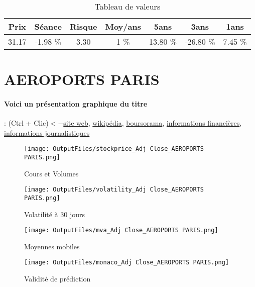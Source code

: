 \documentclass[11pt,a4paper]{report}%
\begin{document}
\begin{table}[H]
  \centering
    \begin{tabular}{|c|c|c|c|c|c|c|}
    \hline
    Prix & Séance & Risque  & Moy/ans & 5ans & 3ans & 1ans \\
    \hline
    31.17 &    -1.98 \%    & 3.30 & 1 \% & 13.80 \% & -26.80 \% & 7.45 \% \\
    \hline
    \end{tabular}%
        \label{tab:table_ACCOR}%
      \caption{Tableau de valeurs}
\end{table}%

\newpage

\section{AEROPORTS PARIS}

\paragraph{Voici un présentation graphique du titre} : (Ctrl + Clic)$<-$\href{https://www.parisaeroport.fr/groupe/finances/relations-investisseurs}{site web}, \href{https://fr.wikipedia.org/wiki/Paris_A%C3%A9roport}{wikipédia}, \href{https://www.boursorama.com/cours/1rPADP}{boursorama}, \href{https://www.qwant.com/?q=site:https:%2f%2fwww.easybourse.com%2faction-societe%2fAEROPORTS-PARIS&t=web&client=ext-firefox-hp}{informations financières}, \href{https://bourse.lerevenu.com/cours-de-bourse/fiche-valeur-synthese/AEROPORTS-PARIS/ADP-FR}{informations journalistiques}
\begin{figure}[!htb]
   \begin{minipage}{0.5\textwidth}
     \centering
     \texttt{[image: OutputFiles/stockprice\_Adj Close\_AEROPORTS PARIS.png]}
     \caption{Cours et Volumes}\label{Fig:price_AEROPORTS PARIS}
   \end{minipage}\hfill
   \begin{minipage}{0.5\textwidth}
     \centering
     \texttt{[image: OutputFiles/volatility\_Adj Close\_AEROPORTS PARIS.png]}
     \caption{Volatilité à 30 jours}\label{Fig:volat_AEROPORTS PARIS}
   \end{minipage}
\end{figure}
\begin{figure}[!htb]
   \begin{minipage}{0.5\textwidth}
     \centering
     \texttt{[image: OutputFiles/mva\_Adj Close\_AEROPORTS PARIS.png]}
     \caption{Moyennes mobiles}\label{Fig:mva_AEROPORTS PARIS}
   \end{minipage}\hfill
   \begin{minipage}{0.5\textwidth}
     \centering
     \texttt{[image: OutputFiles/monaco\_Adj Close\_AEROPORTS PARIS.png]}
     \caption{Validité de prédiction}\label{Fig:prediction_AEROPORTS PARIS}
   \end{minipage}
\end{figure}
\end{document}
